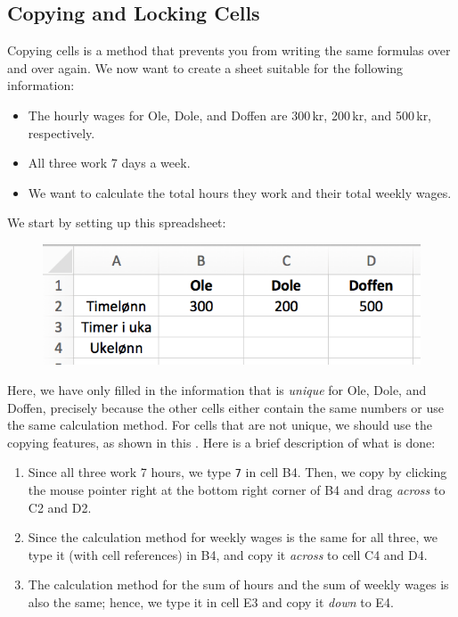 \subsection{Copying and Locking Cells}
Copying cells is a method that prevents you from writing the same formulas over and over again. We now want to create a sheet suitable for the following information:
\begin{itemize}
	\item The hourly wages for Ole, Dole, and Doffen are 300\,kr, 200\,kr, and 500\,kr, respectively.
	\item All three work 7 days a week.
	\item We want to calculate the total hours they work and their total weekly wages.
\end{itemize}

We start by setting up this spreadsheet:
\begin{figure}[H]
	\centering
	\includegraphics[scale=0.3]{figs/ex7}\qquad
\end{figure}
Here, we have only filled in the information that is \textit{unique} for Ole, Dole, and Doffen, precisely because the other cells either contain the same numbers or use the same calculation method. For cells that are not unique, we should use the copying features, as shown in this . Here is a brief description of what is done:
\begin{enumerate}
	\item Since all three work 7 hours, we type {\tt 7} in cell B4. Then, we copy by clicking the mouse pointer right at the bottom right corner of B4 and drag \textsl{across} to C2 and D2.
	\item Since the calculation method for weekly wages is the same for all three, we type it (with cell references) in B4, and copy it \textsl{across} to cell C4 and D4.
	\item The calculation method for the sum of hours and the sum of weekly wages is also the same; hence, we type it in cell E3 and copy it \textsl{down} to E4.
\end{enumerate}
